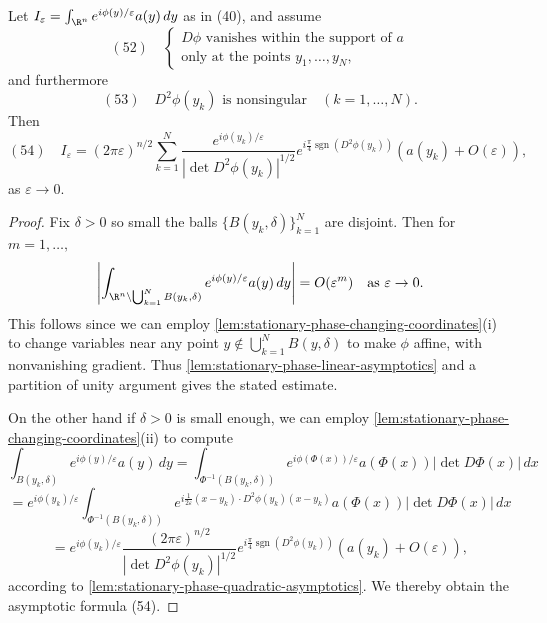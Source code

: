 \begin{proposition}
\label{prop:stationary-phase-asymptotic-formula}
Let $I_\varepsilon = \int_{\R^n} e^{i\phi(y)/\varepsilon} a(y) \, dy$ as in (40), and assume
$$(52) \quad \begin{cases}
D\phi \text{ vanishes within the support of } a \\
\text{only at the points } y_1, \ldots, y_N,
\end{cases}$$
and furthermore
$$(53) \quad D^2\phi(y_k) \text{ is nonsingular} \quad (k = 1, \ldots, N).$$
Then
$$(54) \quad I_\varepsilon = (2\pi\varepsilon)^{n/2} \sum_{k=1}^N \frac{e^{i\phi(y_k)/\varepsilon}}{|\det D^2\phi(y_k)|^{1/2}} e^{i\frac{\pi}{4} \operatorname{sgn}(D^2\phi(y_k))} (a(y_k) + O(\varepsilon)),$$
as $\varepsilon \to 0$.
\end{proposition}
\begin{proof}
Fix $\delta > 0$ so small the balls $\{B(y_k, \delta)\}_{k=1}^N$ are disjoint. Then for $m = 1, \ldots,$
$$\left|\int_{\R^n \setminus \bigcup_{k=1}^N B(y_k,\delta)} e^{i\phi(y)/\varepsilon} a(y) \, dy\right| = O(\varepsilon^m) \quad \text{as } \varepsilon \to 0.$$
This follows since we can employ \cref{lem:stationary-phase-changing-coordinates}(i) to change variables near any point $y \notin \bigcup_{k=1}^N B(y, \delta)$ to make $\phi$ affine, with nonvanishing gradient. Thus \cref{lem:stationary-phase-linear-asymptotics} and a partition of unity argument gives the stated estimate.

On the other hand if $\delta > 0$ is small enough, we can employ \cref{lem:stationary-phase-changing-coordinates}(ii) to compute
$$\int_{B(y_k,\delta)} e^{i\phi(y)/\varepsilon} a(y) \, dy = \int_{\Phi^{-1}(B(y_k,\delta))} e^{i\phi(\Phi(x))/\varepsilon} a(\Phi(x))|\det D\Phi(x)| \, dx$$
$$= e^{i\phi(y_k)/\varepsilon} \int_{\Phi^{-1}(B(y_k,\delta))} e^{i\frac{1}{2\varepsilon}(x-y_k) \cdot D^2\phi(y_k)(x-y_k)} a(\Phi(x))
|\det D\Phi(x)| \, dx$$
$$= e^{i\phi(y_k)/\varepsilon} \frac{(2\pi\varepsilon)^{n/2}}{|\det D^2\phi(y_k)|^{1/2}} e^{i\frac{\pi}{4} \operatorname{sgn}(D^2\phi(y_k))} (a(y_k) + O(\varepsilon)),$$
according to \cref{lem:stationary-phase-quadratic-asymptotics}. We thereby obtain the asymptotic formula (54).
\end{proof}

